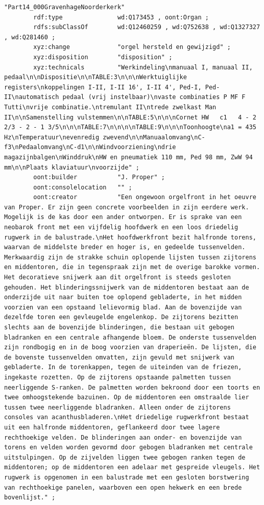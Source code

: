 \begin{lstlisting}[caption={Part14\_000GravenhageNoorderkerk}]
"Part14_000GravenhageNoorderkerk"
        rdf:type               wd:Q173453 , oont:Organ ;
        rdfs:subClassOf        wd:Q12460259 , wd:Q752638 , wd:Q1327327 , wd:Q281460 ;
        xyz:change             "orgel hersteld en gewijzigd" ;
        xyz:disposition        "disposition" ;
        xyz:technicals         "Werkindeling\nmanuaal I, manuaal II, pedaal\n\nDispositie\n\nTABLE:3\n\n\nWerktuiglijke registers\nkoppelingen I-II, I-II 16', I-II 4', Ped-I, Ped-II\nautomatisch pedaal (vrij instelbaar)\nvaste combinaties P MF F Tutti\nvrije combinatie.\ntremulant II\ntrede zwelkast Man II\n\nSamenstelling vulstemmen\n\nTABLE:5\n\n\nCornet HW   c1   4 - 2 2/3 - 2 - 1 3/5\n\n\nTABLE:7\n\n\n\nTABLE:9\n\n\nToonhoogte\na1 = 435 Hz\nTemperatuur\nevenredig zwevend\n\nManuaalomvang\nC-f3\nPedaalomvang\nC-d1\n\nWindvoorziening\ndrie magazijnbalgen\nWinddruk\nHW en pneumatiek 110 mm, Ped 98 mm, ZwW 94 mm\n\nPlaats klaviatuur\nvoorzijde" ;
        oont:builder           "J. Proper" ;
        oont:consolelocation   "" ;
        oont:creator           "Een ongewoon orgelfront in het oeuvre van Proper. Er zijn geen concrete voorbeelden in zijn eerdere werk. Mogelijk is de kas door een ander ontworpen. Er is sprake van een neobarok front met een vijfdelig hoofdwerk en een loos driedelig rugwerk in de balustrade.\nHet hoofdwerkfront bezit halfronde torens, waarvan de middelste breder en hoger is, en gedeelde tussenvelden. Merkwaardig zijn de strakke schuin oplopende lijsten tussen zijtorens en middentoren, die in tegenspraak zijn met de overige barokke vormen. Het decoratieve snijwerk aan dit orgelfront is steeds gesloten gehouden. Het blinderingssnijwerk van de middentoren bestaat aan de onderzijde uit naar buiten toe oplopend gebladerte, in het midden voorzien van een opstaand lelievormig blad. Aan de bovenzijde van dezelfde toren een gevleugelde engelenkop. De zijtorens bezitten slechts aan de bovenzijde blinderingen, die bestaan uit gebogen bladranken en een centrale afhangende bloem. De onderste tussenvelden zijn rondbogig en in de boog voorzien van draperieën. De lijsten, die de bovenste tussenvelden omvatten, zijn gevuld met snijwerk van gebladerte. In de torenkappen, tegen de uiteinden van de friezen, ingekaste rozetten. Op de zijtorens opstaande palmetten tussen neerliggende S-ranken. De palmetten worden bekroond door een toorts en twee omhoogstekende bazuinen. Op de middentoren een omstraalde lier tussen twee neerliggende bladranken. Alleen onder de zijtorens consoles van acanthusbladeren.\nHet driedelige rugwerkfront bestaat uit een halfronde middentoren, geflankeerd door twee lagere rechthoekige velden. De blinderingen aan onder- en bovenzijde van torens en velden worden gevormd door gebogen bladranken met centrale uitstulpingen. Op de zijvelden liggen twee gebogen ranken tegen de middentoren; op de middentoren een adelaar met gespreide vleugels. Het rugwerk is opgenomen in een balustrade met een gesloten borstwering van rechthoekige panelen, waarboven een open hekwerk en een brede bovenlijst." ;

\end{lstlisting}
